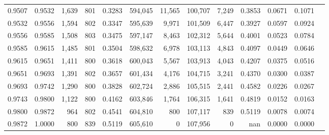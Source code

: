 \begin{tabular}{rrrrrrrrrrrrr}
0.9507 & 0.9532 &  1,639 & 801 &                                     0.3283 & 594,045 &  11,565 & 100,707 &   7,249 & 0.3853 & 0.0671 & 0.1071 \\
0.9532 & 0.9556 &  1,594 & 802 &                                     0.3347 & 595,639 &   9,971 & 101,509 &   6,447 & 0.3927 & 0.0597 & 0.0924 \\
0.9556 & 0.9585 &  1,508 & 803 &                                     0.3475 & 597,147 &   8,463 & 102,312 &   5,644 & 0.4001 & 0.0523 & 0.0784 \\
0.9585 & 0.9615 &  1,485 & 801 &                                     0.3504 & 598,632 &   6,978 & 103,113 &   4,843 & 0.4097 & 0.0449 & 0.0646 \\
0.9615 & 0.9651 &  1,411 & 800 &                                     0.3618 & 600,043 &   5,567 & 103,913 &   4,043 & 0.4207 & 0.0375 & 0.0516 \\
0.9651 & 0.9693 &  1,391 & 802 &                                     0.3657 & 601,434 &   4,176 & 104,715 &   3,241 & 0.4370 & 0.0300 & 0.0387 \\
0.9693 & 0.9742 &  1,290 & 800 &                                     0.3828 & 602,724 &   2,886 & 105,515 &   2,441 & 0.4582 & 0.0226 & 0.0267 \\
0.9743 & 0.9800 &  1,122 & 800 &                                     0.4162 & 603,846 &   1,764 & 106,315 &   1,641 & 0.4819 & 0.0152 & 0.0163 \\
0.9800 & 0.9872 &    964 & 802 &                                     0.4541 & 604,810 &     800 & 107,117 &     839 & 0.5119 & 0.0078 & 0.0074 \\
0.9872 & 1.0000 &    800 & 839 &                                     0.5119 & 605,610 &       0 & 107,956 &       0 &    nan & 0.0000 & 0.0000 \\
\bottomrule
\end{tabular}
